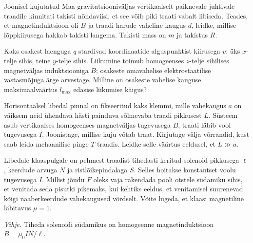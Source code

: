 \documentclass[10pt, twoside]{article}
\begin{document}
{Joonisel kujutatud Maa gravitatsiooniväljas vertikaalselt paiknevale juhtivale traadile kinnitati takisti nõndaviisi, et see võib piki traati vabalt libiseda. Teades, et magnetinduktsioon oli $B$ ja traadi harude vaheline kaugus $d$, leidke, millise lõppkiirusega hakkab takisti langema. Takisti mass on $m$ ja takistus $R$.
\probend
\bigskip


Kaks osakest laenguga $q$ stardivad koordinaatide alguspunktist kiirusega $v$:
üks $x$-telje sihis, teine $y$-telje sihis.
Liikumine toimub homogeenses $z$-telje sihilises magnetväljas induktsiooniga
$B$; osakeste omavahelise
elektrostaatilise vastasmõjuga ärge arvestage. Milline on osakeste vahelise
kauguse maksimaalväärtus $l_{\max}$ edasise liikumise käigus?
\probend
\bigskip


Horisontaalsel libedal pinnal on fikseeritud kaks klemmi, mille vahekaugus $a$ on väiksem neid ühendava hästi painduva sõlmevaba traadi pikkusest $L$. Süsteem asub vertikaalses homogeenses magnetväljas tugevusega $B$, traati läbib vool tugevusega $I$. Joonistage, millise kuju võtab traat. Kirjutage välja võrrandid, kust saab leida mehaanilise pinge $T$ traadis. Leidke selle väärtus eeldusel, et $L \gg a$.
\probend
\bigskip


Libedale klaaspulgale on pehmest traadist tihedasti keritud solenoid pikkusega $\ell$, keerdude arvuga $N$ ja ristlõikepindalaga $S$. Selles hoitakse konstantset voolu tugevusega $I$. Millist jõudu $F$ oleks vaja rakendada pooli otstele südamiku sihis, et venitada seda pisutki pikemaks, kui kehtiks eeldus, et venitamisel suurenevad kõigi naaberkeerdude vahekaugused võrdselt. Võite lugeda, et klaasi magnetiline läbitavus $\mu = 1$. 

\emph{Vihje}. Tiheda solenoidi südamikus on homogeenne magnetinduktsioon$ B = \mu_0IN/\ell$.
\probend
\bigskip


}
\end{document}
